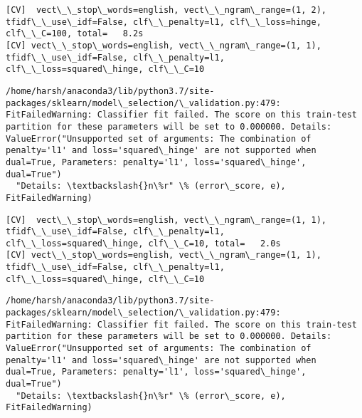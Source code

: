 \documentclass[11pt]{article}
\begin{document}
    \begin{Verbatim}[commandchars=\\\{\}]
[CV]  vect\_\_stop\_words=english, vect\_\_ngram\_range=(1, 2), tfidf\_\_use\_idf=False, clf\_\_penalty=l1, clf\_\_loss=hinge, clf\_\_C=100, total=   8.2s
[CV] vect\_\_stop\_words=english, vect\_\_ngram\_range=(1, 1), tfidf\_\_use\_idf=False, clf\_\_penalty=l1, clf\_\_loss=squared\_hinge, clf\_\_C=10 

    \end{Verbatim}

    \begin{Verbatim}[commandchars=\\\{\}]
/home/harsh/anaconda3/lib/python3.7/site-packages/sklearn/model\_selection/\_validation.py:479: FitFailedWarning: Classifier fit failed. The score on this train-test partition for these parameters will be set to 0.000000. Details: 
ValueError("Unsupported set of arguments: The combination of penalty='l1' and loss='squared\_hinge' are not supported when dual=True, Parameters: penalty='l1', loss='squared\_hinge', dual=True")
  "Details: \textbackslash{}n\%r" \% (error\_score, e), FitFailedWarning)

    \end{Verbatim}

    \begin{Verbatim}[commandchars=\\\{\}]
[CV]  vect\_\_stop\_words=english, vect\_\_ngram\_range=(1, 1), tfidf\_\_use\_idf=False, clf\_\_penalty=l1, clf\_\_loss=squared\_hinge, clf\_\_C=10, total=   2.0s
[CV] vect\_\_stop\_words=english, vect\_\_ngram\_range=(1, 1), tfidf\_\_use\_idf=False, clf\_\_penalty=l1, clf\_\_loss=squared\_hinge, clf\_\_C=10 

    \end{Verbatim}

    \begin{Verbatim}[commandchars=\\\{\}]
/home/harsh/anaconda3/lib/python3.7/site-packages/sklearn/model\_selection/\_validation.py:479: FitFailedWarning: Classifier fit failed. The score on this train-test partition for these parameters will be set to 0.000000. Details: 
ValueError("Unsupported set of arguments: The combination of penalty='l1' and loss='squared\_hinge' are not supported when dual=True, Parameters: penalty='l1', loss='squared\_hinge', dual=True")
  "Details: \textbackslash{}n\%r" \% (error\_score, e), FitFailedWarning)

    \end{Verbatim}
\end{document}
